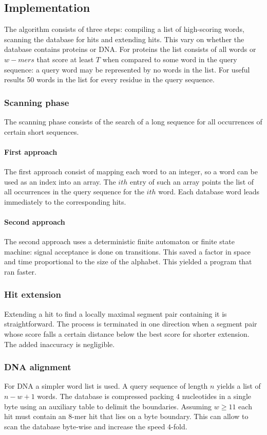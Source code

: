 	\subsection{Implementation}
	The algorithm consists of three steps: compiling a list of high-scoring words, scanning the database for hits and extending hits.
	This vary on whether the database contains proteins or DNA.
	For proteins the list consists of all words or $w-mers$ that score at least $T$ when compared to some word in the query sequence: a query word may be represented by no words in the list.
	For useful results 50 words in the list for every residue in the query sequence.

		\subsubsection{Scanning phase}
		The scanning phase consists of the search of a long sequence for all occurrences of certain short sequences.

			\paragraph{First approach}
			The first approach consist of mapping each word to an integer, so a word can be used as an index into an array.
			The $ith$ entry of such an array points the list of all occurrences in the query sequence for the $ith$ word.
			Each database word leads immediately to the corresponding hits.

			\paragraph{Second approach}
			The second approach uses a deterministic finite automaton or finite state machine: signal acceptance is done on transitions.
			This saved a factor in space and time proportional to the size of the alphabet.
			This yielded a program that ran faster.

		\subsubsection{Hit extension}
		Extending a hit to find a locally maximal segment pair containing it is straightforward.
		The process is terminated in one direction when a segment pair whose score falls a certain distance below the best score for shorter extension.
		The added inaccuracy is negligible.

		\subsubsection{DNA alignment}
		For DNA a simpler word list is used.
		A query sequence of length $n$ yields a list of $n-w+1$ words.
		The database is compressed packing $4$ nucleotides in a single byte using an auxiliary table to delimit the boundaries.
		Assuming $w\ge 11$ each hit must contain an $8$-mer hit that lies on a byte boundary.
		This can allow to scan the database byte-wise and increase the speed $4$-fold.

